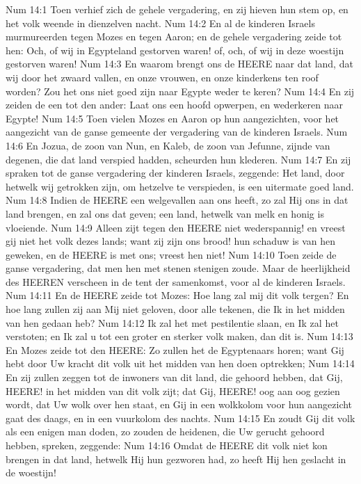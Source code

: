 Num 14:1  Toen verhief zich de gehele vergadering, en zij hieven hun stem op, en het volk weende in dienzelven nacht.
Num 14:2  En al de kinderen Israels murmureerden tegen Mozes en tegen Aaron; en de gehele vergadering zeide tot hen: Och, of wij in Egypteland gestorven waren! of, och, of wij in deze woestijn gestorven waren!
Num 14:3  En waarom brengt ons de HEERE naar dat land, dat wij door het zwaard vallen, en onze vrouwen, en onze kinderkens ten roof worden? Zou het ons niet goed zijn naar Egypte weder te keren?
Num 14:4  En zij zeiden de een tot den ander: Laat ons een hoofd opwerpen, en wederkeren naar Egypte!
Num 14:5  Toen vielen Mozes en Aaron op hun aangezichten, voor het aangezicht van de ganse gemeente der vergadering van de kinderen Israels.
Num 14:6  En Jozua, de zoon van Nun, en Kaleb, de zoon van Jefunne, zijnde van degenen, die dat land verspied hadden, scheurden hun klederen.
Num 14:7  En zij spraken tot de ganse vergadering der kinderen Israels, zeggende: Het land, door hetwelk wij getrokken zijn, om hetzelve te verspieden, is een uitermate goed land.
Num 14:8  Indien de HEERE een welgevallen aan ons heeft, zo zal Hij ons in dat land brengen, en zal ons dat geven; een land, hetwelk van melk en honig is vloeiende.
Num 14:9  Alleen zijt tegen den HEERE niet wederspannig! en vreest gij niet het volk dezes lands; want zij zijn ons brood! hun schaduw is van hen geweken, en de HEERE is met ons; vreest hen niet!
Num 14:10  Toen zeide de ganse vergadering, dat men hen met stenen stenigen zoude. Maar de heerlijkheid des HEEREN verscheen in de tent der samenkomst, voor al de kinderen Israels.
Num 14:11  En de HEERE zeide tot Mozes: Hoe lang zal mij dit volk tergen? En hoe lang zullen zij aan Mij niet geloven, door alle tekenen, die Ik in het midden van hen gedaan heb?
Num 14:12  Ik zal het met pestilentie slaan, en Ik zal het verstoten; en Ik zal u tot een groter en sterker volk maken, dan dit is.
Num 14:13  En Mozes zeide tot den HEERE: Zo zullen het de Egyptenaars horen; want Gij hebt door Uw kracht dit volk uit het midden van hen doen optrekken;
Num 14:14  En zij zullen zeggen tot de inwoners van dit land, die gehoord hebben, dat Gij, HEERE! in het midden van dit volk zijt; dat Gij, HEERE! oog aan oog gezien wordt, dat Uw wolk over hen staat, en Gij in een wolkkolom voor hun aangezicht gaat des daags, en in een vuurkolom des nachts.
Num 14:15  En zoudt Gij dit volk als een enigen man doden, zo zouden de heidenen, die Uw gerucht gehoord hebben, spreken, zeggende:
Num 14:16  Omdat de HEERE dit volk niet kon brengen in dat land, hetwelk Hij hun gezworen had, zo heeft Hij hen geslacht in de woestijn!
